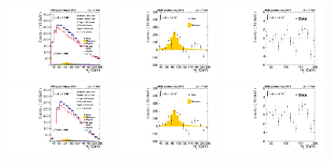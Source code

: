 \begin{figure}[h!] {\centering
{}\linewidth
\includegraphics[width=0.31\textwidth]{figs/CDFtoWW_s0_mJJ-combined-fit.pdf} 
\linewidth
\includegraphics[width=0.31\textwidth]{figs/CDFtoWW_s0_mJJ-combined-fit-subtracted.pdf} 
\linewidth
\includegraphics[width=0.31\textwidth]{figs/CDFtoWW_s0_mJJ-combined-fit-residual.pdf} \\
\linewidth
\includegraphics[width=0.31\textwidth]{figs/CDFtoWW_s1_mJJ-combined-fit.pdf} 
\linewidth
\includegraphics[width=0.31\textwidth]{figs/CDFtoWW_s1_mJJ-combined-fit-subtracted.pdf} 
\linewidth
\includegraphics[width=0.31\textwidth]{figs/CDFtoWW_s1_mJJ-combined-fit-residual.pdf} \\
}
\end{figure}
